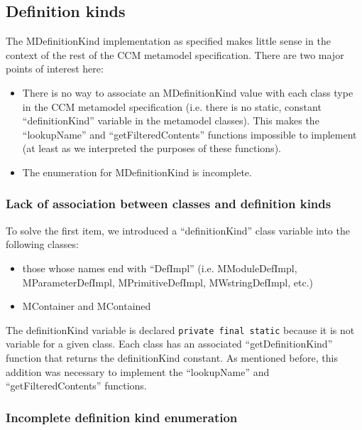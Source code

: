 \subsection{Definition kinds}

The MDefinitionKind implementation as specified makes little sense in the
context of the rest of the CCM metamodel specification. There are two major
points of interest here:

\begin{itemize}
\item There is no way to associate an MDefinitionKind value with each class type
      in the CCM metamodel specification (i.e. there is no static, constant
      ``definitionKind'' variable in the metamodel classes). This makes the
      ``lookupName'' and ``getFilteredContents'' functions impossible to
      implement (at least as we interpreted the purposes of these functions).
\item The enumeration for MDefinitionKind is incomplete.
\end{itemize}

\subsubsection{Lack of association between classes and definition kinds}

To solve the first item, we introduced a ``definitionKind'' class variable into
the following classes:

\begin{itemize}
\item those whose names end with ``DefImpl'' (i.e. MModuleDefImpl,
      MParameterDefImpl, MPrimitiveDefImpl, MWstringDefImpl, etc.)
\item MContainer and MContained
\end{itemize}

The definitionKind variable is declared {\tt private final static} because it is
not variable for a given class. Each class has an associated
``getDefinitionKind'' function that returns the definitionKind constant. As
mentioned before, this addition was necessary to implement the ``lookupName''
and ``getFilteredContents'' functions.

\subsubsection{Incomplete definition kind enumeration}

